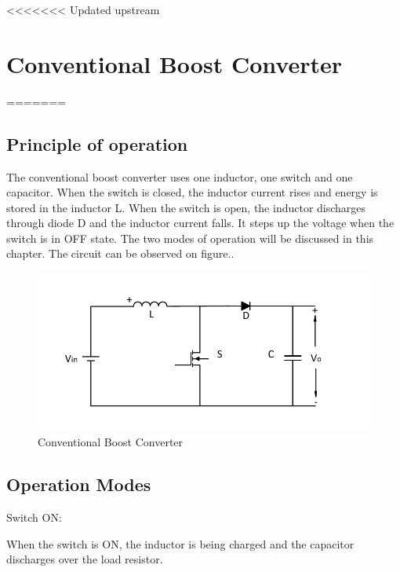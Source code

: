 <<<<<<< Updated upstream
\section{Conventional Boost Converter}\label{ch:CBC}
=======

\subsection{Principle of operation}\label{sec:SON}

The conventional boost converter uses one inductor,
one switch and one capacitor. When the switch is closed, the inductor current rises and energy is stored in the inductor L. When the switch is open, the inductor discharges through diode D and the inductor current falls. It steps up the voltage when
the switch is in OFF state. The two modes of operation will be discussed in this chapter. The circuit can be observed on figure..


\begin{figure}[H]
   \centering
   \includegraphics[width=\textwidth]{figures/aConventionalBoost/ConventionalBoostConverter.pdf}
    \caption{Conventional Boost Converter}
	\label{fig:ConventionalBoost}
\end{figure}

\subsection{Operation Modes}\label{sec:SON}

Switch ON:

When the switch is ON,
the inductor is being charged and the capacitor discharges over the load resistor.

